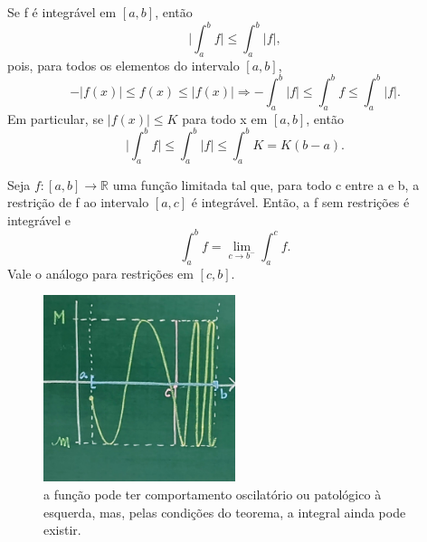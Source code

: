 \documentclass[../analysisII_notes.tex]{subfiles}
\begin{document}
\begin{tcolorbox}[
		skin=enhanced,
		title=Observação,
		fonttitle=\bfseries,
		colframe=black,
		colbacktitle=cyan!75!white,
		colback=cyan!15,
		colbacklower=black,
		coltitle=black,
		drop fuzzy shadow,
	]
	Se f é integrável em \([a, b]\), então
	\[
		\biggl\vert \int_{a}^{b}f \biggr\vert \leq \int_{a}^{b}|f|,
	\]
	pois, para todos os elementos do intervalo \([a, b]\),
	\[
		-|f(x)|\leq f(x)\leq |f(x)| \Rightarrow -\int_{a}^{b}|f|\leq \int_{a}^{b}f\leq \int_{a}^{b}|f|.
	\]
	Em particular, se \(|f(x)|\leq K\) para todo x em \([a, b]\), então
	\[
		\biggl\vert \int_{a}^{b}f \biggr\vert \leq \int_{a}^{b}|f|\leq \int_{a}^{b}K = K(b-a).
	\]
\end{tcolorbox}
\begin{theorem*}
	Seja \(f:[a, b]\rightarrow \mathbb{R}\) uma função limitada tal que, para todo c entre a e b, a restrição de f ao intervalo \([a, c]\) é integrável. Então, a f sem restrições é integrável e
	\[
		\int_{a}^{b}f = \lim_{c\to b^{-}}\int_{a}^{c}f.
	\]
	Vale o análogo para restrições em \([c, b]\).
\end{theorem*}
\begin{figure}[H]
	\begin{center}
		\includegraphics[height=0.5\textheight, width=0.5\textwidth, keepaspectratio]{./Images/squishy_09.png}
	\end{center}
	\caption{a função pode ter comportamento oscilatório ou patológico à esquerda, mas, pelas condições do teorema, a integral ainda pode existir.}
	\label{squish09}
\end{figure}
\end{document}
